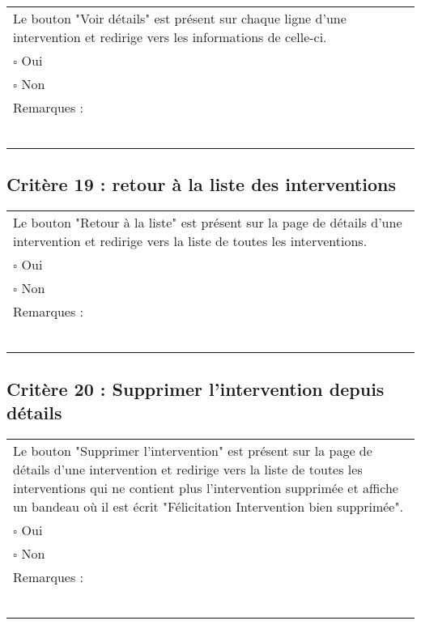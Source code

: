 	\begin{center}
    	 		\begin{tabular}[h]{|p{}|}
			\hline
				Le bouton "Voir détails" est présent sur chaque ligne d'une intervention et redirige vers les informations de celle-ci.\\
				$\square$ Oui  \\ $\square$ Non \\\hline Remarques : \\ ~\\
			 \\\hline
     		\end{tabular}
  		\end{center}	
  		
  		
  		\subsection*{Critère 19 : retour à la liste des interventions}
	
	\begin{center}
    	 		\begin{tabular}[h]{|p{}|}
			\hline
				Le bouton "Retour à la liste" est présent sur la page de détails d'une intervention et redirige vers la liste de toutes les interventions.\\
				$\square$ Oui  \\ $\square$ Non \\\hline Remarques : \\ ~\\
			 \\\hline
     		\end{tabular}
  		\end{center}	
  		
  		
  		\subsection*{Critère 20 : Supprimer l'intervention depuis détails}
	
	\begin{center}
    	 		\begin{tabular}[h]{|p{}|}
			\hline
				Le bouton "Supprimer l'intervention" est présent sur la page de détails d'une intervention et redirige vers la liste de toutes les interventions qui ne contient plus l'intervention supprimée et affiche un bandeau où il est écrit "Félicitation Intervention bien supprimée".\\
				$\square$ Oui  \\ $\square$ Non \\\hline Remarques : \\ ~\\
			 \\\hline
     		\end{tabular}
  		\end{center}
  		
